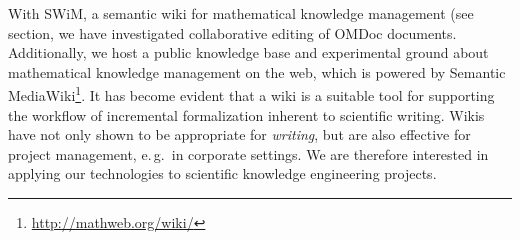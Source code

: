 With SWiM, a semantic wiki for mathematical knowledge management (see
section\cite{Lange:swmkm-tr07}, we have investigated collaborative editing of
OMDoc documents.  Additionally, we host a public knowledge base and experimental
ground about mathematical knowledge management on the web, which is powered by
Semantic MediaWiki\footnote{\url{http://mathweb.org/wiki/}}.  It has become
evident that a wiki is a suitable tool for supporting the workflow of
incremental formalization inherent to scientific writing.  Wikis have not only
shown to be appropriate for \emph{writing}, but are also effective for project
management, e.\,g.\ in corporate settings\cite{leuf01:wikiway,wikinomics}.  We
are therefore interested in applying our technologies to scientific knowledge
engineering projects.

